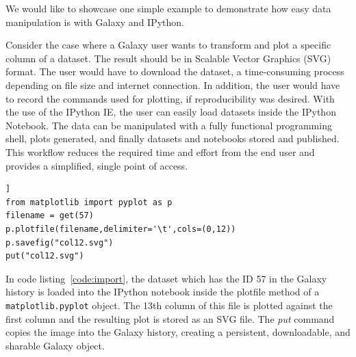 \documentclass{bioinfo}
\begin{document}
\begin{methods}
We would like to showcase one simple example to demonstrate how easy data manipulation is with Galaxy and IPython. 

Consider the case where a Galaxy user wants to transform and plot a specific column of a dataset. 
The result should be in Scalable Vector Graphics (SVG) format. The user would have to download the dataset, 
a time-consuming process depending on file size and internet connection. 
In addition, the user would have to record the commands used for plotting, if reproducibility was desired.
With the use of the IPython IE, the user can easily load datasets inside the IPython Notebook.
The data can be manipulated with a fully functional programming shell, plots generated,
and finally datasets and notebooks stored and published.
This workflow reduces the required time and effort from the end user and provides a simplified, single point of access.

\begin{lstlisting}[frame=single,caption={Plotting example},label=code:import]]
from matplotlib import pyplot as p
filename = get(57)
p.plotfile(filename,delimiter='\t',cols=(0,12))
p.savefig("col12.svg")
put("col12.svg")
\end{lstlisting}

In code listing~\ref{code:import}, the dataset which has the ID 57 in the Galaxy history is loaded 
into the IPython notebook inside the plotfile method of a \texttt{matplotlib.pyplot} object. 
The 13th column of this file is plotted against the first column and the
resulting plot is stored as an SVG file. The \textit{put} command copies the image into the Galaxy history, 
creating a persistent, downloadable, and sharable Galaxy object.


%
%
%
%
%
%
%
%
%
%


\end{methods}
\end{document}

